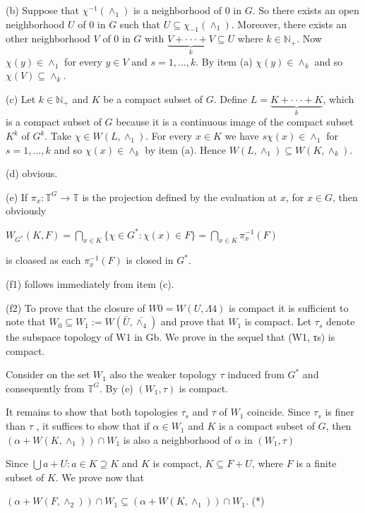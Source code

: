 \documentclass[12pt]{article}
\begin{document}
    (b) Suppose that $\chi^{-1}(\wedge_1)$ is a neighborhood of 0 in $G$. So there exists an open neighborhood $U$ of 0 in $G$
such that $U \subseteq \chi_{-1}(\wedge_1)$. Moreover, there exists an other neighborhood $V$ of 0 in $G$ with $\underbrace{V + · · · + V}_k \subseteq U$ where
$k \in \mathbb{N}_+$. Now $\chi(y) \in \wedge_1$ for every $y \in V$ and $s = 1, . . . , k$. By item (a) $\chi(y) \in \wedge_k$ and so $\chi(V) \subseteq \wedge_k$.


    (c) Let $k \in \mathbb{N}_+$ and $K$ be a compact subset of $G$. Define $L = \underbrace{K + · · · + K}_k$, which is a compact subset of
$G$ because it is a continuous image of the compact subset $K^k$ of $G^k$. Take $\chi \in W(L,\wedge_1)$. For every $x \in K$ we
have $s\chi(x) \in \wedge_1$ for $s = 1, . . . , k$ and so $\chi(x) \in \wedge_k$ by item (a). Hence $W(L,\wedge_1) \subseteq W(K,\wedge_k)$.


    (d) obvious.


    (e) If $\pi_x : \mathbb{T}^G \to \mathbb{T}$ is the projection defined by the evaluation at $x$, for $x \in G$, then obviously


    $W_{G^*} (K, F) = \bigcap_{x \in K} \{\chi \in G^*: \chi(x) \in F\} = \bigcap_{x \in K}\pi^{-1}_{x}(F)$


is cloased as each $\pi^{-1}_{x}(F)$ is closed in $G^*$.


    (f1) follows immediately from item (c).


    (f2) To prove that the closure of $W0 = W(U,Λ4)$ is compact it is sufficient to note that $W_0 \subseteq W_1 := W(\bar{U},\bar{\wedge_4})$
and prove that $W_1$ is compact. Let $\tau_s$ denote the subspace topology of W1 in Gb. We prove in the sequel that
(W1, τs) is compact.


    Consider on the set $W_1$ also the weaker topology $\tau$ induced from $G^*$ and consequently from $\mathbb{T}^G$. By (e)
$(W_1, \tau)$ is compact.


    It remains to show that both topologies $\tau_s$ and $\tau$ of $W_1$ coincide. Since $\tau_s$ is finer than $\tau$ , it suffices to show
that if $\alpha \in W_1$ and $K$ is a compact subset of $G$, then $(\alpha + W(K,\wedge_1)) \cap W_1$ is also a neighborhood of $\alpha$ in
$(W_1, \tau)$


    Since $\bigcup{a + U : a \in K} \supseteq K$ and $K$ is compact, $K \subseteq F + U$, where $F$ is a finite subset of $K$. We prove
now that


    $(\alpha + W(F,\wedge_2)) \cap W_1 \subseteq (\alpha + W(K,\wedge_1)) \cap W_1$. (*) 
\end{document}
